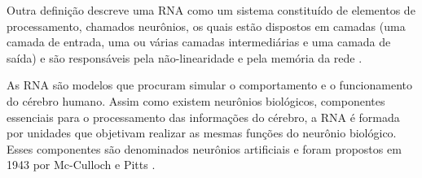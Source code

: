 Outra definição descreve uma RNA como um sistema constituído de elementos de processamento, chamados neurônios, os quais estão dispostos em camadas (uma camada de entrada, uma ou várias camadas intermediárias e uma camada de saída) e são responsáveis pela não-linearidade e pela memória da rede \cite{valenca2005aplicando}.

As RNA são modelos que procuram simular o comportamento e o funcionamento do cérebro humano. Assim como existem neurônios biológicos, componentes essenciais para o processamento das informações do cérebro, a RNA é formada por unidades que objetivam realizar as mesmas funções do neurônio biológico. Esses componentes são denominados neurônios artificiais e foram propostos em 1943 por Mc-Culloch e Pitts \cite{MCCULLOCKPITTS1943}.

